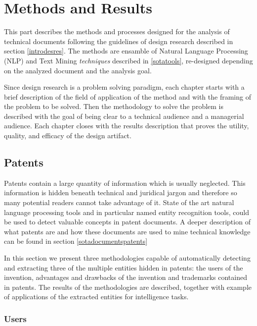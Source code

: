 \documentclass[]{book}
\theoremstyle{definition}
\theoremstyle{definition}
\theoremstyle{definition}
\theoremstyle{remark}
\begin{document}
\part{Methods and Results}\label{part-methods-and-results}

This part describes the methods and processes designed for the analysis
of technical documents following the guidelines of design research
described in section \ref{introdesres}. The methods are ensamble of
Natural Language Processing (NLP) and Text Mining \emph{techniques}
described in \ref{sotatools}, re-designed depending on the analyzed
document and the analysis goal.

Since design research is a problem solving paradigm, each chapter starts
with a brief description of the field of application of the method and
with the framing of the problem to be solved. Then the methodology to
solve the problem is described with the goal of being clear to a
technical audience and a managerial audience. Each chapter closes with
the results description that proves the utility, quality, and efficacy
of the design artifact.

\chapter{Patents}\label{patents}

Patents contain a large quantity of information which is usually
neglected. This information is hidden beneath technical and juridical
jargon and therefore so many potential readers cannot take advantage of
it. State of the art natural language processing tools and in particular
named entity recognition tools, could be used to detect valuable
concepts in patent documents. A deeper description of what patents are
and how these documents are used to mine technical knowledge can be
found in section \ref{sotadocumentspatents}

In this section we present three methodologies capable of automatically
detecting and extracting three of the multiple entities hidden in
patents: the users of the invention, advantages and drawbacks of the
invention and trademarks contained in patents. The results of the
methodologies are described, together with example of applications of
the extracted entities for intelligence tasks.

\section{Users}\label{usersresults}
\end{document}
